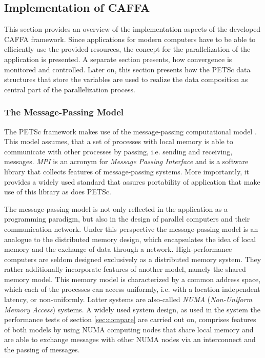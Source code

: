 \subsection{Implementation of CAFFA}
\label{sec:caffaimpl}

This section provides an overview of the implementation aspects of the developed CAFFA framework. Since applications for modern computers have to be able to efficiently use the provided resources, the concept for the parallelization of the application is presented. A separate section presents, how convergence is monitored and controlled. Later on, this section presents how the PETSc data structures that store the variables are used to realize the data composition as central part of the parallelization process.

\subsubsection{The Message-Passing Model}

The PETSc framework makes use of the message-passing computational model \cite{gropp99}. This model assumes, that a set of processes with local memory is able to communicate with other processes by passing, i.e. sending and receiving, messages. \emph{MPI} is an acronym for \emph{Message Passing Interface} and is a software library that collects features of message-passing systems. More importantly, it provides a widely used standard that assures portability of application that make use of this library as does PETSc. 

The message-passing model is not only reflected in the application as a programming paradigm, but also in the design of parallel computers and their communication network. Under this perspective the message-passing model is an analogue to the distributed memory design, which encapsulates the idea of local memory and the exchange of data through a network. High-performance computers are seldom designed exclusively as a distributed memory system. They rather additionally incorporate features of another model, namely the shared memory model. This memory model is characterized by a common address space, which each of the processes can access uniformly, i.e. with a location independent latency, or non-uniformly. Latter systems are also-called \emph{NUMA} (\emph{Non-Uniform Memory Access}) systems. A widely used system design, as used in the system the performance tests of section \ref{sec:compare} are carried out on, comprises features of both models by using NUMA computing nodes that share local memory and are able to exchange messages with other NUMA nodes via an interconnect and the passing of messages.

